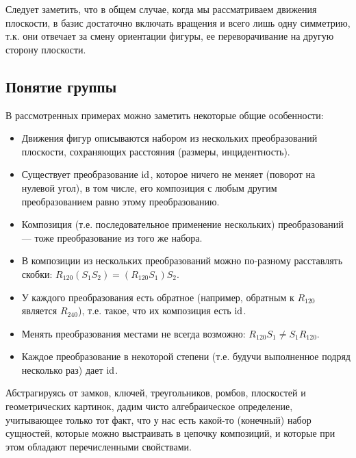 Следует заметить, что в общем случае, когда мы рассматриваем движения плоскости, в базис достаточно включать вращения и всего лишь одну симметрию, т.к. они отвечает за смену ориентации фигуры, ее переворачивание на другую сторону плоскости.



\subsection{Понятие группы}

В рассмотренных примерах можно заметить некоторые общие особенности:
\begin{itemize}
\item Движения фигур описываются набором из нескольких преобразований плоскости, сохраняющих расстояния (размеры, инцидентность).
\item Существует преобразование $\mathrm{id}$, которое ничего не меняет (поворот на нулевой угол), в том числе, его композиция с любым другим преобразованием равно этому преобразованию.
\item Композиция (т.е. последовательное применение нескольких) преобразований --- тоже преобразование из того же набора.
\item В композиции из нескольких преобразований можно по-разному расставлять скобки: $R_{120}(S_1S_2)=(R_{120}S_1)S_2$.
\item У каждого преобразования есть обратное (например, обратным к $R_{120}$ является $R_{240}$), т.е. такое, что их композиция есть $\mathrm{id}$.
\item Менять преобразования местами не всегда возможно: $R_{120}S_1\ne S_1R_{120}$.
\item Каждое преобразование в некоторой степени (т.е. будучи выполненное подряд несколько раз) дает $\mathrm{id}$.
\end{itemize}

Абстрагируясь от замков, ключей, треугольников, ромбов, плоскостей и геометрических картинок, дадим чисто алгебраическое определение, учитывающее только тот факт, что у нас есть какой-то (конечный) набор сущностей, которые можно выстраивать в цепочку композиций, и которые при этом обладают перечисленными свойствами.

